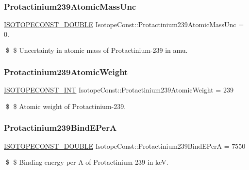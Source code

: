 \subsubsection{\texorpdfstring{Protactinium239\+Atomic\+Mass\+Unc}{Protactinium239AtomicMassUnc}}
{\footnotesize\ttfamily \mbox{\hyperlink{group___isotope_const-_macros_ga8f45a7272ce02c0b4c65c44636ed719a}{I\+S\+O\+T\+O\+P\+E\+C\+O\+N\+S\+T\+\_\+\+D\+O\+U\+B\+LE}} Isotope\+Const\+::\+Protactinium239\+Atomic\+Mass\+Unc = 0.}

\$ \$ Uncertainty in atomic mass of Protactinium-\/239 in amu. \mbox{\label{group___isotope_const-_protactinium-_pa239_ga4bd2d33b39a37b22555e02183882d265}} 
\subsubsection{\texorpdfstring{Protactinium239\+Atomic\+Weight}{Protactinium239AtomicWeight}}
{\footnotesize\ttfamily \mbox{\hyperlink{group___isotope_const-_macros_ga5f18360b3e99483a35c32d789e62621c}{I\+S\+O\+T\+O\+P\+E\+C\+O\+N\+S\+T\+\_\+\+I\+NT}} Isotope\+Const\+::\+Protactinium239\+Atomic\+Weight = 239}

\$ \$ Atomic weight of Protactinium-\/239. \mbox{\label{group___isotope_const-_protactinium-_pa239_ga742cb3593a3e2c54892e4febacf16bdd}} 
\subsubsection{\texorpdfstring{Protactinium239\+Bind\+E\+PerA}{Protactinium239BindEPerA}}
{\footnotesize\ttfamily \mbox{\hyperlink{group___isotope_const-_macros_ga8f45a7272ce02c0b4c65c44636ed719a}{I\+S\+O\+T\+O\+P\+E\+C\+O\+N\+S\+T\+\_\+\+D\+O\+U\+B\+LE}} Isotope\+Const\+::\+Protactinium239\+Bind\+E\+PerA = 7550}

\$ \$ Binding energy per A of Protactinium-\/239 in keV. \mbox{\label{group___isotope_const-_protactinium-_pa239_ga8afdc5bd8318f30ac5bc5358e7d94886}} 

